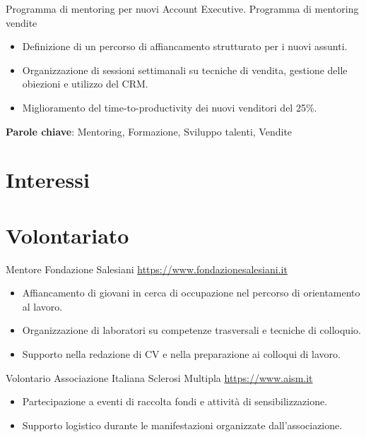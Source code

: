 \documentclass[a4paper, serif, 10pt]{moderncv}
\begin{document}
        {Programma di mentoring per nuovi Account Executive.}
        {Programma di mentoring vendite}
        {}
        {}
        {\begin{itemize}
\item Definizione di un percorso di affiancamento strutturato per i nuovi assunti.
\item Organizzazione di sessioni settimanali su tecniche di vendita, gestione delle obiezioni e utilizzo del CRM.
\item Miglioramento del time-to-productivity dei nuovi venditori del 25\%.
\end{itemize}
\textbf{Parole chiave}: Mentoring, Formazione, Sviluppo talenti, Vendite}
\section{Interessi}

\section{Volontariato}

        {Mentore}
        {Fondazione Salesiani}
        {\url{https://www.fondazionesalesiani.it}}
        {}
        {\begin{itemize}
\item Affiancamento di giovani in cerca di occupazione nel percorso di orientamento al lavoro.
\item Organizzazione di laboratori su competenze trasversali e tecniche di colloquio.
\item Supporto nella redazione di CV e nella preparazione ai colloqui di lavoro.
\end{itemize}}
    

        {Volontario}
        {Associazione Italiana Sclerosi Multipla}
        {\url{https://www.aism.it}}
        {}
        {\begin{itemize}
\item Partecipazione a eventi di raccolta fondi e attività di sensibilizzazione.
\item Supporto logistico durante le manifestazioni organizzate dall'associazione.
\end{itemize}}
    
\end{document}
